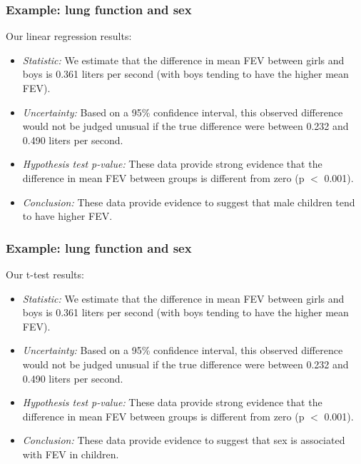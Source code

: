 \documentclass[12pt, 
hyperref={colorlinks=true, linkcolor=blue, urlcolor=cyan},dvipsnames]{beamer}
\begin{document}
\begin{frame}
\frametitle{Example: lung function and sex}

Our linear regression results:

\begin{itemize}
\item \textit{Statistic:} We estimate that the difference in mean FEV between girls and boys is 0.361 liters per second (with boys tending to have the higher mean FEV). \pause
\item \textit{Uncertainty:} Based on a 95\% confidence interval, this observed difference would not be judged unusual if the true difference were between 0.232 and 0.490 liters per second.\pause
\item \textit{Hypothesis test p-value:} These data provide strong evidence that the difference in mean FEV between groups is different from zero (p $<$ 0.001).\pause
\item \textit{Conclusion:} These data provide evidence to suggest that male children tend to have higher FEV.
\end{itemize}

\end{frame}

\begin{frame}
\frametitle{Example: lung function and sex}

Our t-test results: 

\begin{itemize}
\item \textit{Statistic:} We estimate that the difference in mean FEV between girls and boys is 0.361 liters per second (with boys tending to have the higher mean FEV). 
\item \textit{Uncertainty:} Based on a 95\% confidence interval, this observed difference would not be judged unusual if the true difference were between 0.232 and 0.490 liters per second.
\item \textit{Hypothesis test p-value:} These data provide strong evidence that the difference in mean FEV between groups is different from zero (p $<$ 0.001).
\item \textit{Conclusion:} These data provide evidence to suggest that sex is associated with FEV in children.
\end{itemize}

\end{frame}
\end{document}
